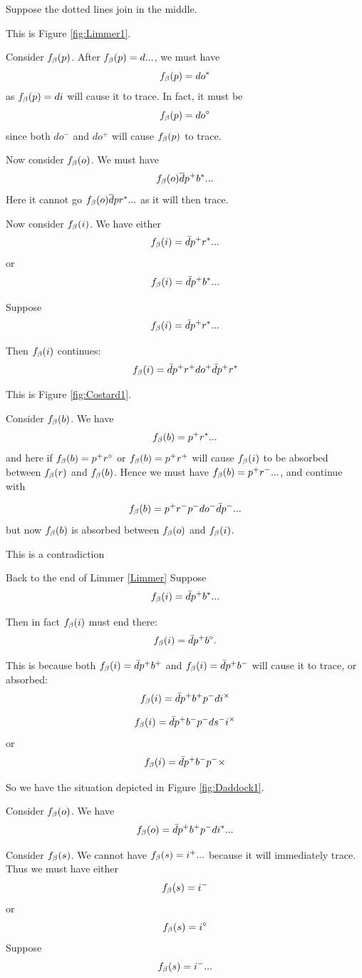  \label{Limmer}
Suppose the dotted lines join in the middle. 

This is Figure \ref{fig:Limmer1}.

Consider $f_\beta(p)$. After $f_\beta(p) = d...$, we must have
\[
f_\beta(p) = d o^*
\]
as $f_\beta(p) = d i$ will cause it to trace. In fact, it must be
\[
f_\beta(p) = d o^\circ
\]
since both $d o^-$ and $d o^+$ will cause $f_\beta(p)$ to trace.

Now consider $f_\beta(o)$. We must have
\[
f_\beta(o) \overline{d} p^+ b^*...
\]
Here it cannot go $f_\beta(o) \overline{d} p r^*...$ as it will then trace.

Now consider $f_\beta(i)$. We have either
\[
f_\beta(i) = \bar{d} p^+ r^*...
\]
or 
\[
f_\beta(i) = \bar{d} p^+ b^*...
\]

\label{Costard}
Suppose 
\[
f_\beta(i) = \bar{d} p^+ r^*...
\]

Then $f_\beta(i)$ continues:
\[
f_\beta(i) = \bar{d} p^+ r^+ d o^+ \bar{d} p^+ r^*
\]

This is Figure \ref{fig:Costard1}.

Consider $f_\beta(b)$. We have
\[
f_\beta(b) = p^+ r^*...
\]
and here if $f_\beta(b) = p^+ r^\circ$ or  $f_\beta(b) = p^+ r^+$ will cause $f_\beta(i)$ to be absorbed between $f_\beta(r)$ and $f_\beta(b)$. Hence we must have $f_\beta(b) = p^+ r^-...$, and continue with

\[
f_\beta(b) = p^+ r^-p^- d o^- \bar{d} p^-...
\]
but now $f_\beta(b)$ is absorbed between $f_\beta(o)$ and $f_\beta(i)$.

This is a contradiction


 \label{Daddock}
Back to the end of Limmer \ref{Limmer}
Suppose 
\[
f_\beta(i) = \bar{d} p^+ b^*...
\]

Then in fact $f_\beta(i)$ must end there:
\[
f_\beta(i) = \bar{d} p^+ b^\circ.
\]

This is because both $f_\beta(i) = \bar{d} p^+ b^+$ and $f_\beta(i) = \bar{d} p^+ b^-$ will cause it to trace, or absorbed:
\[
f_\beta(i) = \bar{d} p^+ b^+ p^- d i^\times
\]

\[
f_\beta(i) = \bar{d} p^+ b^- p^- d  s^- i^\times
\]
or 
\[
f_\beta(i) = \bar{d} p^+ b^- p^- \times
\]

So we have the situation depicted in Figure \ref{fig:Daddock1}.

Consider $f_\beta(o)$. We have 
\[
f_\beta(o) = \bar{d} p^+ b^+ p^- d i^*...
\]

Consider $f_\beta(s)$. We cannot have $f_\beta(s) = i^+...$ because it will immediately trace.
Thus we must have either
\[
f_\beta(s) = i^-
\]
or
\[
f_\beta(s) = i^\circ
\]
\label{Cordwain}
Suppose 
\[
f_\beta(s) = i^-...
\]


